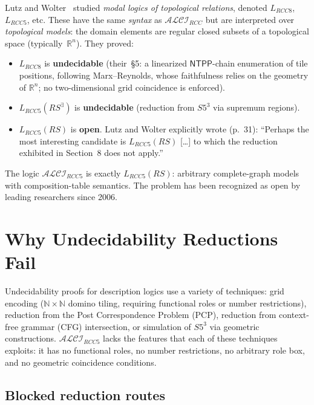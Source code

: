 \documentclass[
]{ceurart}
\theoremstyle{definition}
\newcommand{\ALCIRCC}[1]{\ensuremath{\mathcal{ALCI}_{\mathit{RCC#1}}}}
\newcommand{\LRCC}[1]{\ensuremath{L_{\mathit{RCC#1}}}}
\newcommand{\NTPP}{\ensuremath{\mathsf{NTPP}}}
\newcommand{\naturals}{\mathbb{N}}
\newcommand{\reals}{\mathbb{R}}
\begin{document}
Lutz and Wolter~\cite{LutzWolter2006} studied \emph{modal logics
of topological relations}, denoted $\LRCC{8}$, $\LRCC{5}$, etc.
These have the same \emph{syntax} as $\ALCIRCC{}$ but are
interpreted over \emph{topological models}: the domain elements
are regular closed subsets of a topological space (typically~$\reals^n$).
They proved:
\begin{itemize}
  \item $\LRCC{8}$ is \textbf{undecidable} (their~\S5: a linearized
    $\NTPP$-chain enumeration of tile positions, following
    Marx--Reynolds, whose faithfulness relies on the geometry of
    $\reals^n$; no two-dimensional grid coincidence is enforced).
  \item $\LRCC{5}(\mathit{RS}^\exists)$ is \textbf{undecidable}
    (reduction from $S5^3$ via supremum regions).
  \item $\LRCC{5}(\mathit{RS})$ is \textbf{open}. Lutz and Wolter
    explicitly wrote (p.~31): ``Perhaps the most interesting
    candidate is $L_{RCC5}(RS)$ [\ldots] to which the reduction
    exhibited in Section~8 does not apply.''
\end{itemize}

The logic $\ALCIRCC{5}$ is exactly $\LRCC{5}(\mathit{RS})$:
arbitrary complete-graph models with composition-table semantics.
The problem has been recognized as open by leading researchers
since 2006.

\section{Why Undecidability Reductions Fail}
\label{sec:undecidability}

Undecidability proofs for description logics use a variety of
techniques: grid encoding ($\naturals \times \naturals$ domino
tiling, requiring functional roles or number restrictions),
reduction from the Post Correspondence Problem (PCP), reduction
from context-free grammar (CFG) intersection, or simulation of
$S5^3$ via geometric constructions.
$\ALCIRCC{5}$ lacks the features that each of these techniques
exploits: it has no functional roles, no number restrictions,
no arbitrary role box, and no geometric coincidence conditions.

\subsection{Blocked reduction routes}
\end{document}

